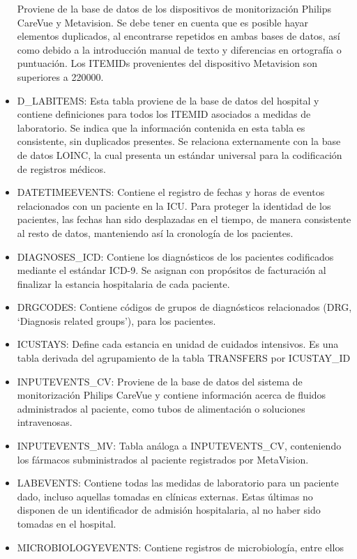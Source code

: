 \documentclass{report}
\begin{document}
\begin{itemize}
  Proviene de la base de datos de los dispositivos de monitorización
  Philips CareVue y Metavision. Se debe tener en cuenta que es posible
  hayar elementos duplicados, al encontrarse repetidos en ambas bases de
  datos, así como debido a la introducción manual de texto y diferencias
  en ortografía o puntuación. Los ITEMIDs provenientes del dispositivo
  Metavision son superiores a 220000.
\item
  D\_LABITEMS: Esta tabla proviene de la base de datos del hospital y
  contiene definiciones para todos los ITEMID asociados a medidas de
  laboratorio. Se indica que la información contenida en esta tabla es
  consistente, sin duplicados presentes. Se relaciona externamente con
  la base de datos LOINC, la cual presenta un estándar universal para la
  codificación de registros médicos. 
\item
  DATETIMEEVENTS: Contiene el registro de fechas y horas de eventos
  relacionados con un paciente en la ICU. Para proteger la identidad de
  los pacientes, las fechas han sido desplazadas en el tiempo, de manera
  consistente al resto de datos, manteniendo así la cronología de los
  pacientes. 
\item
  DIAGNOSES\_ICD: Contiene los diagnósticos de los pacientes codificados
  mediante el estándar ICD-9. Se asignan con propósitos de facturación
  al finalizar la estancia hospitalaria de cada paciente. 
\item
  DRGCODES: Contiene códigos de grupos de diagnósticos relacionados
  (DRG, `Diagnosis related groups'), para los pacientes.
\item
  ICUSTAYS: Define cada estancia en unidad de cuidados intensivos. Es
  una tabla derivada del agrupamiento de la tabla TRANSFERS por
  ICUSTAY\_ID
\item
  INPUTEVENTS\_CV: Proviene de la base de datos del sistema de
  monitorización Philips CareVue y contiene información acerca de
  fluidos administrados al paciente, como tubos de alimentación o
  soluciones intravenosas. 
\item
  INPUTEVENTS\_MV: Tabla análoga a INPUTEVENTS\_CV, conteniendo los
  fármacos subministrados al paciente registrados por MetaVision.
\item
  LABEVENTS: Contiene todas las medidas de laboratorio para un paciente
  dado, incluso aquellas tomadas en clínicas externas. Estas últimas no
  disponen de un identificador de admisión hospitalaria, al no haber
  sido tomadas en el hospital.
\item
  MICROBIOLOGYEVENTS: Contiene registros de microbiología, entre ellos

\end{itemize}
\end{document}
